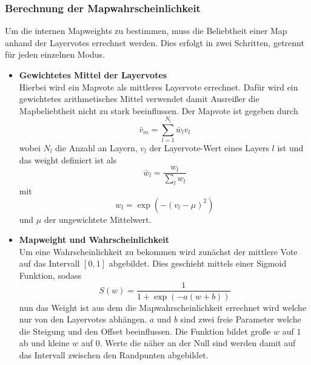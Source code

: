         \subsubsection{Berechnung der Mapwahrscheinlichkeit}
            Um die internen Mapweights zu bestimmen, muss die Beliebtheit einer Map anhand der Layervotes errechnet werden.
            Dies erfolgt in zwei Schritten, getrennt für jeden einzelnen Modus.
            \begin{itemize}
                \item \textbf{Gewichtetes Mittel der Layervotes}\\
                Hierbei wird ein Mapvote als mittleres Layervote errechnet.
                Dafür wird ein gewichtetes arithmetisches Mittel verwendet damit \glqq{}Ausreißer\grqq{} die Mapbeliebtheit nicht zu stark beeinflussen.
                Der Mapvote ist gegeben durch
                \begin{equation}
                    \bar{v}_m = \sum_{l=1}^{N_l} \bar{w}_l v_l
                \end{equation}
                wobei $N_l$ die Anzahl an Layern, $v_l$ der Layervote-Wert eines Layers $l$ ist und das weight definiert ist als
                \begin{equation}
                    \bar{w}_l = \frac{w_l}{\sum_l w_l}
                \end{equation}
                mit
                \begin{equation}
                    w_l = \exp\left(-\left(v_l-\mu\right)^2\right)
                \end{equation}
                und $\mu$ der ungewichtete Mittelwert.
                \item \textbf{Mapweight und Wahrscheinlichkeit}\\
                Um eine Wahrscheinlichkeit zu bekommen wird zunächst der mittlere Vote auf das Intervall $[0,1]$ abgebildet.
                Dies geschieht mittels einer Sigmoid Funktion, sodass
                \begin{equation}
                    S(w) = \frac{1}{1+\exp\left(-a(w+b)\right)}
                \end{equation}
                nun das Weight ist aus dem die Mapwahrscheinlichkeit errechnet wird welche nur von den Layervotes abhängen. $a$ und $b$ sind zwei freie Parameter welche die Steigung und den Offset beeinflussen.
                Die Funktion bildet große $w$ auf $1$ ab und kleine $w$ auf $0$.
                Werte die näher an der Null sind werden damit auf das Intervall zwischen den Randpunten abgebildet.

\end{itemize}
